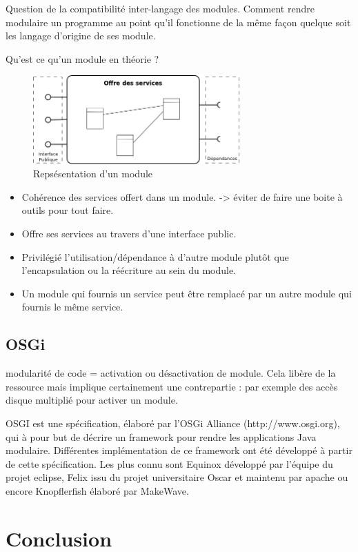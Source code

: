 \documentclass[a4paper, 11pt]{report}
\begin{document}
Question de la compatibilité inter-langage des modules. Comment rendre modulaire un programme au point qu’il fonctionne de la même façon quelque soit les langage d’origine de ses module.

Qu’est ce qu’un module en théorie ?
\begin{figure}
	\begin{center}
		\includegraphics[width=300px]{../../Figures/Bibliographie/modular}
		\caption{Repsésentation d'un module}
	\end{center}
\end{figure}

\begin{itemize}
	\item Cohérence des services offert dans un module. -> éviter de faire une boite à outils pour tout faire.
	\item Offre ses services au travers d’une interface public.
	\item Privilégié l’utilisation/dépendance à d’autre module plutôt que l’encapsulation ou la réécriture au sein du module.
	\item Un module qui fournis un service peut être remplacé par un autre module qui fournis le même service.
\end{itemize}
\subsection{OSGi}
modularité de code = activation ou désactivation de module. Cela libère de la ressource mais implique certainement une contrepartie : par exemple des accès disque multiplié pour activer un module.

OSGI est une spécification, élaboré par l’OSGi Alliance (http://www.osgi.org), qui à pour but de décrire un framework pour rendre les applications Java modulaire. Différentes implémentation de ce framework ont été développé à partir de cette spécification. Les plus connu sont Equinox développé par l’équipe du projet eclipse, Felix issu du projet universitaire Oscar et maintenu par apache ou encore Knopflerfish élaboré par MakeWave.
\section{Conclusion}
\end{document}
